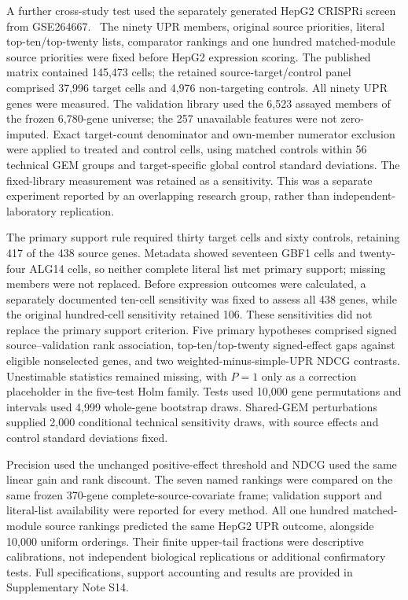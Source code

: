 \documentclass[a4paper,fleqn]{cas-sc}
\makeatletter
\DeclareRobustCommand{\rev}[1]{{\color{red}\def\@citecolor{black}\def\@linkcolor{red}\def\@urlcolor{red}#1}}
\let\unmarkedcite\cite
\renewcommand{\cite}[1]{{\color{black}\def\@citecolor{black}\unmarkedcite{#1}}}
\makeatother
\begin{document}
\rev{A further cross-study test used the separately generated HepG2 CRISPRi screen from GSE264667.~\cite{nadig2025}} \rev{The ninety UPR members, original source priorities, literal top-ten/top-twenty lists, comparator rankings and one hundred matched-module source priorities were fixed before HepG2 expression scoring.} \rev{The published matrix contained 145,473 cells; the retained source-target/control panel comprised 37,996 target cells and 4,976 non-targeting controls.} \rev{All ninety UPR genes were measured.} \rev{The validation library used the 6,523 assayed members of the frozen 6,780-gene universe; the 257 unavailable features were not zero-imputed.} \rev{Exact target-count denominator and own-member numerator exclusion were applied to treated and control cells, using matched controls within 56 technical GEM groups and target-specific global control standard deviations.} \rev{The fixed-library measurement was retained as a sensitivity.} \rev{This was a separate experiment reported by an overlapping research group, rather than independent-laboratory replication.}

\rev{The primary support rule required thirty target cells and sixty controls, retaining 417 of the 438 source genes.} \rev{Metadata showed seventeen GBF1 cells and twenty-four ALG14 cells, so neither complete literal list met primary support; missing members were not replaced.} \rev{Before expression outcomes were calculated, a separately documented ten-cell sensitivity was fixed to assess all 438 genes, while the original hundred-cell sensitivity retained 106.} \rev{These sensitivities did not replace the primary support criterion.} \rev{Five primary hypotheses comprised signed source--validation rank association, top-ten/top-twenty signed-effect gaps against eligible nonselected genes, and two weighted-minus-simple-UPR NDCG contrasts.} \rev{Unestimable statistics remained missing, with $P=1$ only as a correction placeholder in the five-test Holm family.} \rev{Tests used 10,000 gene permutations and intervals used 4,999 whole-gene bootstrap draws.} \rev{Shared-GEM perturbations supplied 2,000 conditional technical sensitivity draws, with source effects and control standard deviations fixed.}

\rev{Precision used the unchanged positive-effect threshold and NDCG used the same linear gain and rank discount.} \rev{The seven named rankings were compared on the same frozen 370-gene complete-source-covariate frame; validation support and literal-list availability were reported for every method.} \rev{All one hundred matched-module source rankings predicted the same HepG2 UPR outcome, alongside 10,000 uniform orderings.} \rev{Their finite upper-tail fractions were descriptive calibrations, not independent biological replications or additional confirmatory tests.} \rev{Full specifications, support accounting and results are provided in Supplementary Note S14.}
\end{document}
